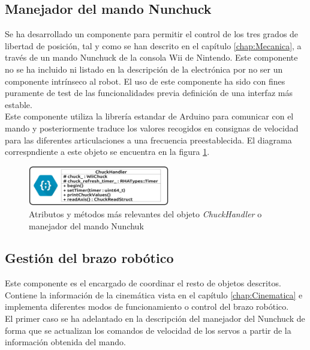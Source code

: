     \subsection{Manejador del mando Nunchuck} \label{subsec:SW:chuck_handler}
        Se ha desarrollado un componente para permitir el control de los tres grados de libertad de posición, tal y como se han descrito en el capítulo \ref{chap:Mecanica}, a través de un mando Nunchuck de la consola Wii de Nintendo. Este componente no se ha incluido ni listado en la descripción de la electrónica por no ser un componente intrínseco al robot. El uso de este componente ha sido con fines puramente de test de las funcionalidades previa definición de una interfaz más estable.
        \\
        
        Este componente utiliza la librería  estandar de Arduino para comunicar con el mando y posteriormente traduce los valores recogidos en consignas de velocidad para las diferentes articulaciones a una frecuencia preestablecida. El diagrama correspndiente a este objeto se encuentra en la figura \ref{fig:SW:class_diagram_CHH}.

        \begin{figure}[H]
          	\centering
          	\includegraphics[width=0.55\textwidth]{figuras/Imagenes_SW/class_diagram_CHH.jpg}
          	\caption{Atributos y métodos más relevantes del objeto \textit{ChuckHandler} o manejador del mando Nunchuk}
          	\label{fig:SW:class_diagram_CHH}
        \end{figure}

    \subsection{Gestión del brazo robótico} \label{subsec:SW:robotrha}
        Este componente es el encargado de coordinar el resto de objetos descritos. Contiene la información de la cinemática vista en el capítulo \ref{chap:Cinematica} e implementa diferentes modos de funcionamiento o control del brazo robótico.
        \\
        
        El primer caso se ha adelantado en la descripción del manejador del Nunchuck de forma que se actualizan los comandos de velocidad de los servos a partir de la información obtenida del mando.
        \\
        
